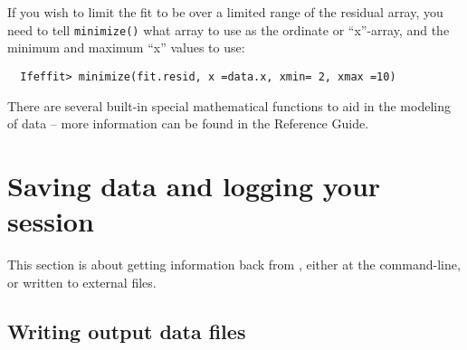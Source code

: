 \documentclass[11pt]{article}
\begin{document}
If you wish to limit the fit to be over a limited range of the residual
array, you need to tell {\tt{minimize()}} what array to use as the
ordinate or ``x''-array, and the minimum and  maximum ``x'' values to use:
{\small\begin{verbatim}
  Ifeffit> minimize(fit.resid, x =data.x, xmin= 2, xmax =10)
\end{verbatim}
}\noindent
There are several built-in special mathematical functions to aid in the
modeling of data -- more information can be found in the Reference Guide.


\clearpage
\section{Saving data and logging your {\ifeffit} session}\label{s:log-save}

This section is about getting information back from {\ifeffit}, either at
the command-line, or written to external files.

\subsection{Writing output data files}
\label{s:log-save:write-data}
\end{document}
